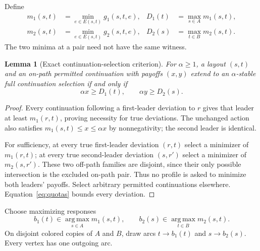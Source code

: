 \documentclass[11pt]{article}
\newtheorem{lemma}[theorem]{Lemma}
\theoremstyle{definition}
\theoremstyle{remark}
\newcommand{\argmax}{\operatorname*{arg\,max}}
\begin{document}
Define
\begin{align*}
 m_1(s,t)&=\min_{e\in E(s,t)}g_1(s,t,e),&
 D_1(t)&=\max_{s\in A}m_1(s,t),\\
 m_2(s,t)&=\min_{e\in E(s,t)}g_2(s,t,e),&
 D_2(s)&=\max_{t\in B}m_2(s,t).
\end{align*}
The two minima at a pair need not have the same witness.

\begin{lemma}[Exact continuation-selection criterion]\label{lem:selection}
For $\alpha\ge1$, a layout $(s,t)$ and an on-path permitted continuation with payoffs $(x,y)$ extend to an $\alpha$-stable full continuation selection if and only if
\begin{equation}\label{eq:quotas}
 \alpha x\ge D_1(t),\qquad \alpha y\ge D_2(s).
\end{equation}
\end{lemma}
\begin{proof}
Every continuation following a first-leader deviation to $r$ gives that leader at least $m_1(r,t)$, proving necessity for true deviations. The unchanged action also satisfies $m_1(s,t)\le x\le\alpha x$ by nonnegativity; the second leader is identical.

For sufficiency, at every true first-leader deviation $(r,t)$ select a minimizer of $m_1(r,t)$; at every true second-leader deviation $(s,r')$ select a minimizer of $m_2(s,r')$. These two off-path families are disjoint, since their only possible intersection is the excluded on-path pair. Thus no profile is asked to minimize both leaders' payoffs. Select arbitrary permitted continuations elsewhere. Equation~\eqref{eq:quotas} bounds every deviation.
\end{proof}

Choose maximizing responses
\[
 b_1(t)\in\argmax_{s\in A}m_1(s,t),\qquad
 b_2(s)\in\argmax_{t\in B}m_2(s,t).
\]
On disjoint colored copies of $A$ and $B$, draw arcs $t\to b_1(t)$ and $s\to b_2(s)$. Every vertex has one outgoing arc.
\end{document}
